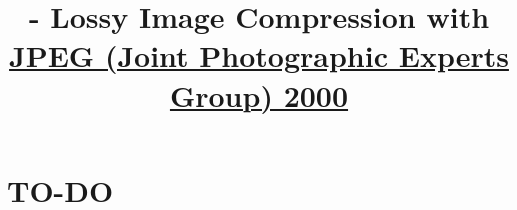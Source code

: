 

\title{\SM{} - Lossy Image Compression with \href{https://en.wikipedia.org/wiki/JPEG_2000}{JPEG (Joint Photographic Experts Group) 2000}}

\maketitle
\tableofcontents

\section{TO-DO}

